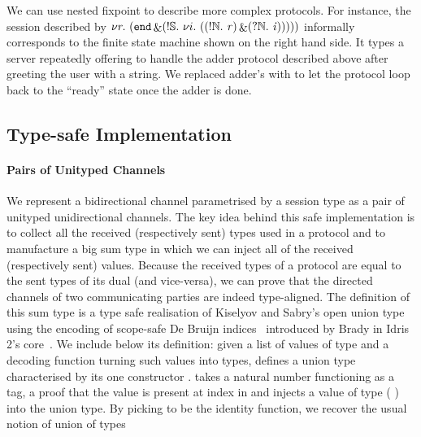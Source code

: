 \documentclass{easychair}
\begin{document}
We can use nested fixpoint to describe more complex
protocols. For instance, the session described by
$
\nu r.~(\mathtt{end} \mathop{\&} (!\mathbb{S}.~\nu i.~((!\mathbb{N}.~\mathit{r}) \mathop{\&} (?\mathbb{N}.~\mathit{i}))
  )))
$
informally corresponds to the finite state machine
shown on the right hand side.
%
It types a server repeatedly offering to handle the adder
protocol described above after greeting the user with a string.
We replaced adder's \stopsesh{} with  to let the protocol
loop back to the ``ready'' state once the adder is done.


\subsection*{Type-safe Implementation}

\paragraph{Pairs of Unityped Channels}
We represent a bidirectional channel parametrised by a session
type as a pair of unityped unidirectional channels.
%
The key idea behind this safe implementation is to collect
all the received (respectively sent) types used in a protocol
and to manufacture a big sum type in which we can inject all
of the received (respectively sent) values.
%
Because the received types of a protocol are equal to the sent
types of its dual (and vice-versa), we can prove that the directed
channels of two communicating parties are indeed type-aligned.
%
The definition of this sum type is a type safe realisation of
Kiselyov and Sabry's open union type~\cite{DBLP:conf/haskell/KiselyovSS13}
using the encoding of scope-safe
De Bruijn indices~\cite{MANUAL:journals/math/debruijn72}
introduced by Brady in Idris 2's core~\cite{DBLP:conf/ecoop/Brady21}.
%
We include below its definition: given
a list  of values of type 
and a decoding function  turning such values into types,
 defines a union type characterised by its one
constructor .
 takes a natural number  functioning as a tag,
a proof that the value  is present at index 
in  and injects a value of type ( )
into the union type.
%
By picking  to be the identity function, we recover the
usual notion of union of types
\end{document}
